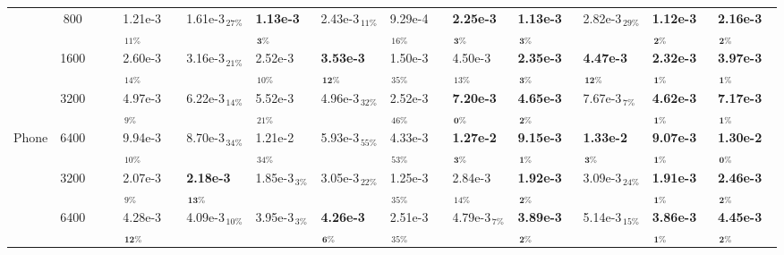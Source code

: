 \documentclass[lettersize,journal]{IEEEtran}
\begin{document}
\begin{table}[t]
\begin{tabular}{c|c|cc|ll|ll|ll|ll|ll}
			\Xhline{0.6pt}\rule{0pt}{8pt}
			& 800 & \cellcolor{lightgray}{1.10e-3} & \cellcolor{lightgray}{2.20e-3} & 1.21e-3$_{\,11\%}$ & 1.61e-3$_{\,27\%}$ & \textbf{\color{blue}1.13e-3$_\mathbf{\,3\%}$} & 2.43e-3$_{\,11\%}$ & 9.29e-4$_{\,16\%}$ & \textbf{\color{blue}2.25e-3$_\mathbf{\,3\%}$} & \textbf{\color{blue}1.13e-3$_\mathbf{\,3\%}$} & 2.82e-3$_{\,29\%}$ & \textbf{\color{red}1.12e-3$_\mathbf{\,2\%}$} & \textbf{\color{red}2.16e-3$_\mathbf{\,2\%}$}\\
			& 1600 & \cellcolor{lightgray}{2.30e-3} & \cellcolor{lightgray}{4.00e-3} & 2.60e-3$_{\,14\%}$ & 3.16e-3$_{\,21\%}$ & 2.52e-3$_{\,10\%}$ & \textbf{\color{blue}3.53e-3$_\mathbf{\,12\%}$} & 1.50e-3$_{\,35\%}$ & 4.50e-3$_{\,13\%}$ & \textbf{\color{blue}2.35e-3$_\mathbf{\,3\%}$} & \textbf{\color{blue}4.47e-3$_\mathbf{\,12\%}$} & \textbf{\color{red}2.32e-3$_\mathbf{\,1\%}$} & \textbf{\color{red}3.97e-3$_\mathbf{\,1\%}$}\\
			& 3200 & \cellcolor{lightgray}{4.60e-3} & \cellcolor{lightgray}{7.20e-3} & 4.97e-3$_{\,9\%}$ & 6.22e-3$_{\,14\%}$ & 5.52e-3$_{\,21\%}$ & 4.96e-3$_{\,32\%}$ & 2.52e-3$_{\,46\%}$ & \textbf{\color{red}7.20e-3$_\mathbf{\,0\%}$} & \textbf{\color{blue}4.65e-3$_\mathbf{\,2\%}$} & 7.67e-3$_{\,7\%}$ & \textbf{\color{red}4.62e-3$_\mathbf{\,1\%}$} & \textbf{\color{blue}7.17e-3$_\mathbf{\,1\%}$}\\
			\multirow{-4}{*}{Phone} & 6400 & \cellcolor{lightgray}{9.10e-3} & \cellcolor{lightgray}{1.30e-2} & 9.94e-3$_{\,10\%}$ & 8.70e-3$_{\,34\%}$ & 1.21e-2$_{\,34\%}$ & 5.93e-3$_{\,55\%}$ & 4.33e-3$_{\,53\%}$ & \textbf{\color{blue}1.27e-2$_\mathbf{\,3\%}$} & \textbf{\color{blue}9.15e-3$_\mathbf{\,1\%}$} & \textbf{\color{blue}1.33e-2$_\mathbf{\,3\%}$} & \textbf{\color{red}9.07e-3$_\mathbf{\,1\%}$} & \textbf{\color{red}1.30e-2$_\mathbf{\,0\%}$}\\
			\Xhline{0.6pt}\rule{0pt}{8pt}
			& 3200 & \cellcolor{lightgray}{1.90e-3} & \cellcolor{lightgray}{2.50e-3} & 2.07e-3$_{\,9\%}$ & \textbf{\color{blue}2.18e-3$_\mathbf{\,13\%}$} & 1.85e-3$_{\,3\%}$ & 3.05e-3$_{\,22\%}$ & 1.25e-3$_{\,35\%}$ & 2.84e-3$_{\,14\%}$ & \textbf{\color{blue}1.92e-3$_\mathbf{\,2\%}$} & 3.09e-3$_{\,24\%}$ & \textbf{\color{red}1.91e-3$_\mathbf{\,1\%}$} & \textbf{\color{red}2.46e-3$_\mathbf{\,2\%}$}\\
			& 6400 & \cellcolor{lightgray}{3.85e-3} & \cellcolor{lightgray}{4.50e-3} & 4.28e-3$_\mathbf{\,12\%}$ & 4.09e-3$_{\,10\%}$ & 3.95e-3$_{\,3\%}$ & \textbf{\color{blue}4.26e-3$_\mathbf{\,6\%}$} & 2.51e-3$_{\,35\%}$ & 4.79e-3$_{\,7\%}$ & \textbf{\color{blue}3.89e-3$_\mathbf{\,2\%}$} & 5.14e-3$_{\,15\%}$ & \textbf{\color{red}3.86e-3$_\mathbf{\,1\%}$} & \textbf{\color{red}4.45e-3$_\mathbf{\,2\%}$}\\

\end{tabular}
\end{table}
\end{document}
